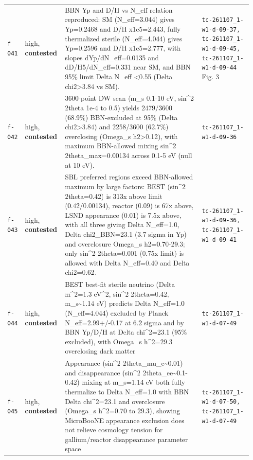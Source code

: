 \documentclass[11pt,a4paper]{article}
\begin{document}
\begin{longtable}{@{}p{}p{}p{}p{}@{}}
\texttt{f-041} & high, \textbf{contested} & BBN Yp and D/H vs N\_eff relation reproduced: SM (N\_eff=3.044) gives Yp=0.2468 and D/H x1e5=2.443, fully thermalized sterile (N\_eff=4.044) gives Yp=0.2596 and D/H x1e5=2.777, with slopes dYp/dN\_eff=0.0135 and dD/H5/dN\_eff=0.331 near SM, and BBN 95\% limit Delta N\_eff \textless{}0.55 (Delta chi2\textgreater{}3.84 vs SM). & \texttt{tc-261107\_\allowbreak{}1-w1-d-09-37,\allowbreak{} tc-261107\_\allowbreak{}1-w1-d-09-45,\allowbreak{} tc-261107\_\allowbreak{}1-w1-d-09-44} Fig. 3 \\
\texttt{f-042} & high, \textbf{contested} & 3600-point DW scan (m\_s 0.1-10 eV, sin\textasciicircum{}2 2theta 1e-4 to 0.5) yields 2479/3600 (68.9\%) BBN-excluded at 95\% (Delta chi2\textgreater{}3.84) and 2258/3600 (62.7\%) overclosing (Omega\_s h2\textgreater{}0.12), with maximum BBN-allowed mixing sin\textasciicircum{}2 2theta\_max=0.00134 across 0.1-5 eV (null at 10 eV). & \texttt{tc-261107\_\allowbreak{}1-w1-d-09-36} \\
\texttt{f-043} & high, \textbf{contested} & SBL preferred regions exceed BBN-allowed maximum by large factors: BEST (sin\textasciicircum{}2 2theta=0.42) is 313x above limit (0.42/0.00134), reactor (0.09) is 67x above, LSND appearance (0.01) is 7.5x above, with all three giving Delta N\_eff=1.0, Delta chi2\_BBN=23.1 (3.7 sigma in Yp) and overclosure Omega\_s h2=0.70-29.3; only sin\textasciicircum{}2 2theta=0.001 (0.75x limit) is allowed with Delta N\_eff=0.40 and Delta chi2=0.62. & \texttt{tc-261107\_\allowbreak{}1-w1-d-09-36,\allowbreak{} tc-261107\_\allowbreak{}1-w1-d-09-41} \\
\texttt{f-044} & high, \textbf{contested} & BEST best-fit sterile neutrino (Delta m\textasciicircum{}2=1.3 eV\textasciicircum{}2, sin\textasciicircum{}2 2theta=0.42, m\_s\textasciitilde{}1.14 eV) predicts Delta N\_eff=1.0 (N\_eff=4.044) excluded by Planck N\_eff=2.99+/-0.17 at 6.2 sigma and by BBN Yp/D/H at Delta chi\textasciicircum{}2=23.1 (95\% excluded), with Omega\_s h\textasciicircum{}2=29.3 overclosing dark matter & \texttt{tc-261107\_\allowbreak{}1-w1-d-07-49} \\
\texttt{f-045} & high, \textbf{contested} & Appearance (sin\textasciicircum{}2 2theta\_mu\_e\textasciitilde{}0.01) and disappearance (sin\textasciicircum{}2 2theta\_ee\textasciitilde{}0.1-0.42) mixing at m\_s=1.14 eV both fully thermalize to Delta N\_eff=1.0 with BBN Delta chi\textasciicircum{}2=23.1 and overclosure (Omega\_s h\textasciicircum{}2=0.70 to 29.3), showing MicroBooNE appearance exclusion does not relieve cosmology tension for gallium/reactor disappearance parameter space & \texttt{tc-261107\_\allowbreak{}1-w1-d-07-50,\allowbreak{} tc-261107\_\allowbreak{}1-w1-d-07-49} \\

\end{longtable}
\end{document}
